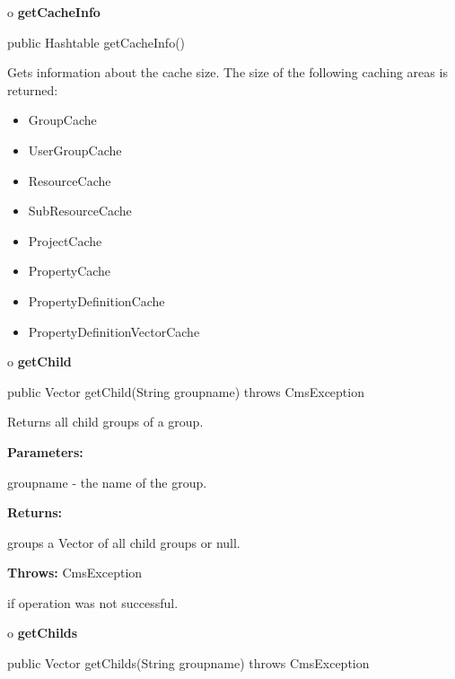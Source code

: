 o {\bf getCacheInfo} 

\begin{PRE}
 public Hashtable getCacheInfo()
\end{PRE}

\begin{description}
\htmlDD Gets information about the cache size. \htmlBR
The size of the following caching areas is returned: 

\begin{itemize}
\item GroupCache  
\item UserGroupCache  
\item ResourceCache  
\item SubResourceCache  
\item ProjectCache  
\item PropertyCache  
\item PropertyDefinitionCache  
\item PropertyDefinitionVectorCache 
\end{itemize}

\end{description}

o {\bf getChild} 

\begin{PRE}
 public Vector getChild(String groupname) throws CmsException
\end{PRE}

\begin{description}
\htmlDD Returns all child groups of a group. 

\begin{description}
\item {\bf Parameters:}  

groupname - the name of the group.  
\item {\bf Returns:}  

groups a Vector of all child groups or null.  
\item {\bf Throws:} CmsException  

if operation was not successful.  
\end{description}

\end{description}

o {\bf getChilds} 

\begin{PRE}
 public Vector getChilds(String groupname) throws CmsException
\end{PRE}

